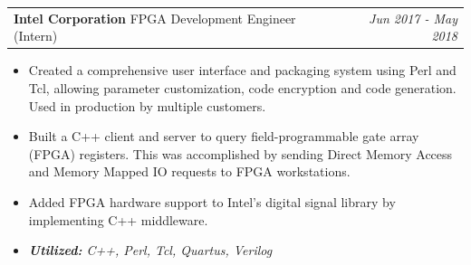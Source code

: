 \documentclass[letterpaper,10pt]{article}
\makeatletter
\newcommand{\resitem}[1]{\item #1 \vspace{0pt}}
\newcommand{\ressubheading}[4]{
\begin{tabular*}{7in}{l@{\extracolsep{\fill}}r}
		\textbf{#1} #2 & \textit{#4} \\
\end{tabular*}\vspace{0pt}}
\makeatother
\begin{document}
    \ressubheading{Intel Corporation}{FPGA Development Engineer (Intern)}{}{Jun 2017 - May 2018}
	\begin{itemize} \vspace{-\topsep}
    \setlength{\parskip}{0pt}
    \setlength{\itemsep}{0pt plus 1pt}
            \resitem{Created a comprehensive user interface and packaging system using Perl and Tcl, allowing parameter customization, code encryption and code generation. Used in production by multiple customers.}
    \resitem{Built a C++ client and server to query field-programmable gate array (FPGA) registers. This was accomplished by sending Direct Memory Access and Memory Mapped IO requests to FPGA workstations.}
	\resitem{Added FPGA hardware support to Intel's digital signal library by implementing C++ middleware.}

    \resitem{\textsl{\textbf{Utilized:}  C++, Perl, Tcl, Quartus, Verilog}}
	\end{itemize}

\end{document}
